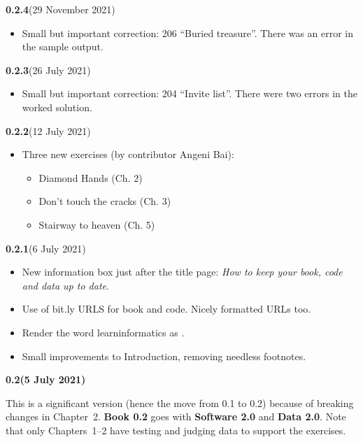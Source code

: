 

{
\small

\newcommand{\versionmarker}[2]{\textbf{#1}\quad(#2)}
\newcommand{\versionmarkerspecial}[2]{{\color{BrickRed}\bfseries#1\quad(#2)}}

\versionmarker{0.2.4}{29 November 2021}
\begin{itemize}
  \item Small but important correction: 206 ``Buried treasure''. There was an error in the
    sample output.
\end{itemize}

\versionmarker{0.2.3}{26 July 2021}
\begin{itemize}
  \item Small but important correction: 204 ``Invite list''. There were two errors in the
    worked solution.
\end{itemize}

\versionmarker{0.2.2}{12 July 2021}
\begin{itemize}
  \item Three new exercises (by contributor Angeni Bai):
    \begin{itemize}
      \item Diamond Hands (Ch. 2)
      \item Don't touch the cracks (Ch. 3)
      \item Stairway to heaven (Ch. 5)
    \end{itemize}
\end{itemize}

\versionmarker{0.2.1}{6 July 2021}
\begin{itemize}
  \item New information box just after the title page: \emph{How to keep your book, code
    and data up to date}.
  \item Use of bit.ly URLS for book and code. Nicely formatted URLs too.
  \item Render the word learninformatics as \learninformatics{}.
  \item Small improvements to Introduction, removing needless footnotes.
\end{itemize}

\versionmarkerspecial{0.2}{5 July 2021}

This is a significant version (hence the move from 0.1 to 0.2) because of breaking changes
in Chapter~2. \textbf{Book 0.2} goes with \textbf{Software 2.0} and \textbf{Data 2.0}.
Note that only Chapters~1--2 have testing and judging data to support the exercises.

}
